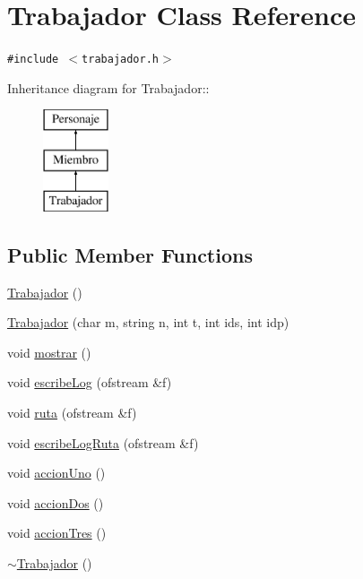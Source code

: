 \hypertarget{classTrabajador}{
\section{Trabajador Class Reference}
\label{classTrabajador}
}
{\tt \#include $<$trabajador.h$>$}

Inheritance diagram for Trabajador::\begin{figure}[H]
\begin{center}
\leavevmode
\includegraphics[height=3cm]{classTrabajador}
\end{center}
\end{figure}
\subsection*{Public Member Functions}
\begin{CompactItemize}
\item 
\hyperlink{classTrabajador_3238c3ef60a3e888aa1995399fbee23d}{Trabajador} ()
\item 
\hyperlink{classTrabajador_0596d6d4ac1eaab49ccabb42dfd2fc68}{Trabajador} (char m, string n, int t, int ids, int idp)
\item 
void \hyperlink{classTrabajador_49e5a94181d6a517d9f5213335da1e27}{mostrar} ()
\item 
void \hyperlink{classTrabajador_332796b26094df07fa7b8b39c345f8f4}{escribeLog} (ofstream \&f)
\item 
void \hyperlink{classTrabajador_6b940e57a18466eafa2dcfe0a60313d3}{ruta} (ofstream \&f)
\item 
void \hyperlink{classTrabajador_ae7afce778764088e53c23b21876ac96}{escribeLogRuta} (ofstream \&f)
\item 
void \hyperlink{classTrabajador_ea6e8089295c87f0b5a5014895f28526}{accionUno} ()
\item 
void \hyperlink{classTrabajador_598df69f74628e4da5d0dc776c98b114}{accionDos} ()
\item 
void \hyperlink{classTrabajador_9203576ae93a8854b033f1d91e25fee7}{accionTres} ()
\item 
\hyperlink{classTrabajador_aa31c7df293b6d054e0e41e4b0e27412}{$\sim$Trabajador} ()
\end{CompactItemize}


